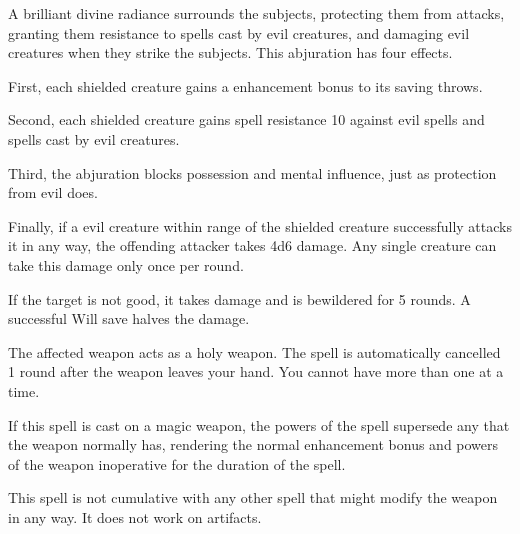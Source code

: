 \begin{spelleffect}
  A brilliant divine radiance surrounds the subjects, protecting them from attacks, granting them resistance to spells cast by evil creatures, and damaging evil creatures when they strike the subjects. This abjuration has four effects.
  \par First, each shielded creature gains a  enhancement bonus to its saving throws.
  \par Second, each shielded creature gains spell resistance 10 against evil spells and spells cast by evil creatures.
  \par Third, the abjuration blocks possession and mental influence, just as protection from evil does.
  \par Finally, if a evil creature within \rngmed range of the shielded creature successfully attacks it in any way, the offending attacker takes 4d6 damage. Any single creature can take this damage only once per round.
\end{spelleffect}

\spellrng{\rngmed}
\begin{spelleffect}
  If the target is not good, it takes damage and is bewildered for 5 rounds. A successful Will save halves the damage.
\end{spelleffect}

\spellrng{\rngtouch}
\spelldur{\durmed}
\begin{spelleffect}
  The affected weapon acts as a  holy weapon. The spell is automatically cancelled 1 round after the weapon leaves your hand. You cannot have more than one  at a time.
  \par If this spell is cast on a magic weapon, the powers of the spell supersede any that the weapon normally has, rendering the normal enhancement bonus and powers of the weapon inoperative for the duration of the spell.
\end{spelleffect}
\begin{spellnotes}
  This spell is not cumulative with any other spell that might modify the weapon in any way. It does not work on artifacts.
\end{spellnotes}

